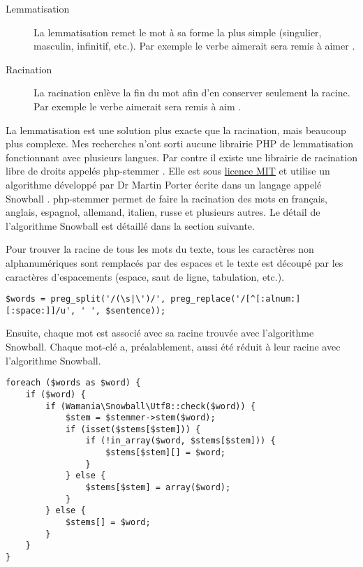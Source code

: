 \begin{description}
  \item[Lemmatisation]
  
  La lemmatisation remet le mot à sa forme la plus simple (singulier, masculin, infinitif, etc.). Par exemple le verbe \og aimerait \fg{} sera remis à \og aimer \fg{}.
  
  \item[Racination]
  
  La racination enlève la fin du mot afin d'en conserver seulement la racine. Par exemple le verbe \og aimerait \fg{} sera remis à \og aim \fg{}.
\end{description}

La lemmatisation est une solution plus exacte que la racination, mais beaucoup plus complexe. Mes recherches n'ont sorti aucune librairie PHP de lemmatisation fonctionnant avec plusieurs langues. Par contre il existe une librairie de racination libre de droits appelés php-stemmer \cite{phpstemmer}. Elle est sous \href{https://raw.githubusercontent.com/wamania/php-stemmer/master/LICENSE}{licence MIT} et utilise un algorithme développé par Dr Martin Porter écrite dans un langage appelé Snowball \cite{snowball}. php-stemmer permet de faire la racination des mots en français, anglais, espagnol, allemand, italien, russe et plusieurs autres. Le détail de l'algorithme Snowball est détaillé dans la section suivante.

Pour trouver la racine de tous les mots du texte, tous les caractères non alphanumériques sont remplacés par des espaces et le texte est découpé par les caractères d'espacements (espace, saut de ligne, tabulation, etc.).

\begin{lstlisting}[frame=l]
$words = preg_split('/(\s|\')/', preg_replace('/[^[:alnum:][:space:]]/u', ' ', $sentence));
\end{lstlisting}

Ensuite, chaque mot est associé avec sa racine trouvée avec l'algorithme Snowball. Chaque mot-clé a, préalablement, aussi été réduit à leur racine avec l'algorithme Snowball.

\begin{lstlisting}[frame=l]
foreach ($words as $word) {
	if ($word) {
		if (Wamania\Snowball\Utf8::check($word)) {
			$stem = $stemmer->stem($word);
			if (isset($stems[$stem])) {
				if (!in_array($word, $stems[$stem])) {
					$stems[$stem][] = $word;
				}
			} else {
				$stems[$stem] = array($word);
			}
		} else {
			$stems[] = $word;
		}
	}
}
\end{lstlisting}

